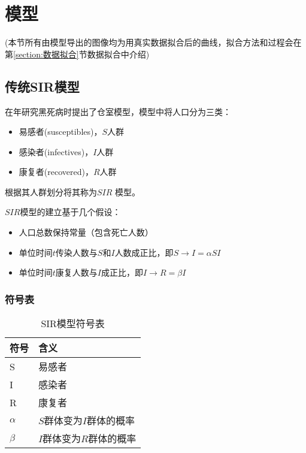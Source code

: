 \section{模型}
 (本节所有由模型导出的图像均为用真实数据拟合后的曲线，拟合方法和过程会在第\ref{section:数据拟合}节数据拟合中介绍)
\subsection{传统SIR模型}
\citeauthor{对流行病数学理论的贡献}在\citeyear{对流行病数学理论的贡献}年研究黑死病时提出了仓室模型，模型中将人口分为三类：
\begin{itemize}
    \item 易感者(susceptibles)，$S$人群
    \item 感染者(infectives)，$I$人群
    \item 康复者(recovered)，$R$人群
\end{itemize}
\par 根据其人群划分将其称为$SIR$
\cite{对流行病数学理论的贡献}模型。
\par $SIR$模型的建立基于几个假设\cite{对流行病数学理论的贡献}：
\begin{itemize}
    \item 人口总数保持常量（包含死亡人数）
    \item 单位时间$t$传染人数与$S$和$I$人数成正比，即$S\to I = \alpha SI$
    \item 单位时间$t$康复人数与$I$成正比，即$I\to R = \beta I$
\end{itemize}
\subsubsection{符号表}
\begin{table}[H]
    \centering
    \caption{SIR模型符号表}
    \label{table:SIR模型符号表}
    \begin{tabular}{ll}
        \hline
        符号     & 含义                     \\
        \hline
        S        & 易感者                   \\
        I        & 感染者                   \\
        R        & 康复者                   \\
        $\alpha$ & $S$群体变为$I$群体的概率 \\
        $\beta$  & $I$群体变为$R$群体的概率 \\
        \hline
    \end{tabular}
\end{table}
